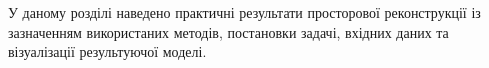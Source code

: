 У даному розділі наведено практичні результати просторової реконструкції
із зазначенням використаних методів, постановки задачі,
вхідних даних та візуалізації результуючої моделі.
